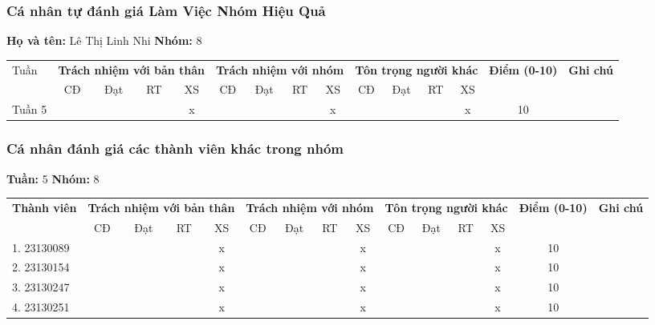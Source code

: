 \subsubsection*{Cá nhân tự đánh giá Làm Việc Nhóm Hiệu Quả}

\noindent \textbf{Họ và tên:} Lê Thị Linh Nhi \hrulefill \quad \textbf{Nhóm:} 8 \hrulefill

\vspace{0.5cm}

\begin{tabularx}{\linewidth}{|X|c|c|c|c|c|c|c|c|c|c|c|c|c|c|}
\hline
Tuần & \multicolumn{4}{c|}{\textbf{Trách nhiệm với bản thân}} & \multicolumn{4}{c|}{\textbf{Trách nhiệm với nhóm}} & \multicolumn{4}{c|}{\textbf{Tôn trọng người khác}} & \multirow{2}{1.5cm}{\textbf{Điểm (0-10)}} & \multirow{2}{1.5cm}{\textbf{Ghi chú}} \\ \cline{2-13}
 & CĐ & Đạt & RT & XS & CĐ & Đạt & RT & XS & CĐ & Đạt & RT & XS & & \\ \hline
  Tuần 5 & & & & x & & & & x & & & & x & 10 & \\ \hline
\end{tabularx}

\vspace{1cm}

\subsubsection*{Cá nhân đánh giá các thành viên khác trong nhóm}

\noindent \textbf{Tuần:} 5 \hrulefill \quad \textbf{Nhóm:} 8 \hrulefill

\vspace{0.5cm}

\begin{tabularx}{\linewidth}{|X|c|c|c|c|c|c|c|c|c|c|c|c|c|c|}
\hline
\multirow{2}{3cm}{\textbf{Thành viên}} & \multicolumn{4}{c|}{\textbf{Trách nhiệm với bản thân}} & \multicolumn{4}{c|}{\textbf{Trách nhiệm với nhóm}} & \multicolumn{4}{c|}{\textbf{Tôn trọng người khác}} & \multirow{2}{1.2cm}{\textbf{Điểm (0-10)}} & \multirow{2}{1.5cm}{\textbf{Ghi chú}} \\ \cline{2-13}
 & CĐ & Đạt & RT & XS & CĐ & Đạt & RT & XS & CĐ & Đạt & RT & XS & & \\ \hline
1. 23130089 & & & & x & & & & x & & & & x & 10 & \\ \hline
2. 23130154 & & & & x & & & & x & & & & x & 10 & \\ \hline
3. 23130247 & & & & x & & & & x & & & & x & 10 & \\ \hline
4. 23130251 & & & & x & & & & x & & & & x & 10 & \\ \hline
\end{tabularx}
